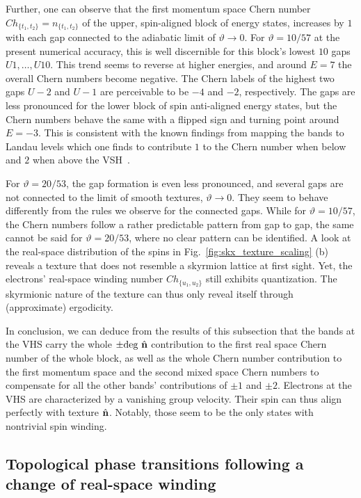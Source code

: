 \documentclass[submission, Phys]{SciPost}
\begin{document}
Further, one can observe that the first momentum space Chern number $Ch_{\lbrace t_1, t_2 \rbrace }=n_{\lbrace t_1, t_2 \rbrace }$ of the upper, spin-aligned block of energy states, increases by $1$ with each gap connected to the adiabatic limit of $\vartheta\to 0$.
For $\vartheta=10/57$ at the present numerical accuracy, this is well discernible for this block's lowest $10$ gaps $U1,\dots,U10$.
This trend seems to reverse at higher energies, and around $E=7$ the overall Chern numbers become negative.
The Chern labels of the highest two gaps $U-2$ and $U-1$ are perceivable to be $-4$ and $-2$, respectively.
The gaps are less pronounced for the lower block of spin anti-aligned energy states, but the Chern numbers behave the same with a flipped sign and turning point around $E=-3$.
This is consistent with the known findings from mapping the bands to Landau levels which one finds to contribute $1$ to the Chern number when below and $2$ when above the VSH~\cite{Gobel2017}.

\figureV

For $\vartheta=20/53$, the gap formation is even less pronounced, and several gaps are not connected to the limit of smooth textures, $\vartheta\to 0$.
They seem to behave differently from the rules we observe for the connected gaps. 
While for $\vartheta=10/57$, the Chern numbers follow a rather predictable pattern from gap to gap, the same cannot be said for $\vartheta=20/53$, where no clear pattern can be identified.
A look at the real-space distribution of the spins in Fig.~\ref{fig:skx_texture_scaling} (b) reveals a texture that does not resemble a skyrmion lattice at first sight. 
Yet, the electrons' real-space winding number $Ch_{\lbrace u_1,u_2 \rbrace }$ still exhibits quantization. 
The skyrmionic nature of the texture can thus only reveal itself through (approximate) ergodicity.

In conclusion, we can deduce from the results of this subsection that the bands at the VHS carry the whole $\pm \mathrm{deg}~\hat{\mathbf{n}}$ contribution to the first real space Chern number of the whole block, as well as the whole Chern number contribution to the first momentum space and the second mixed space Chern numbers to compensate for all the other bands' contributions of $\pm 1$ and $\pm2$.
Electrons at the VHS are characterized by a vanishing group velocity.
Their spin can thus align perfectly with texture $\hat{\mathbf{n}}$.
Notably, those seem to be the only states with nontrivial spin winding.


\subsection{Topological phase transitions following a change of real-space winding}
\end{document}
